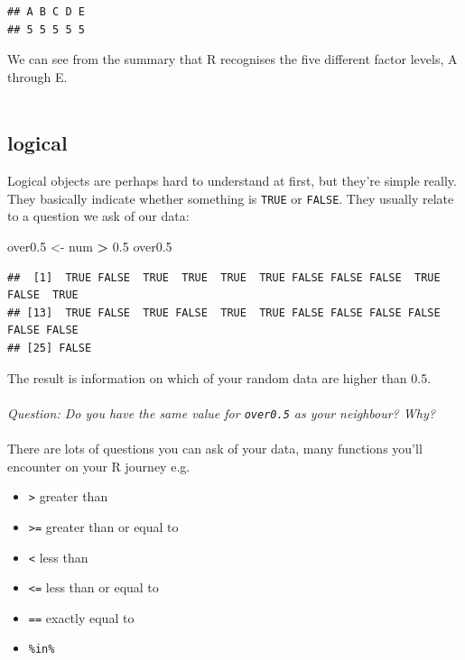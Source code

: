 \documentclass[
]{book}
\newenvironment{Shaded}{\begin{snugshade}}{\end{snugshade}}
\newcommand{\FloatTok}[1]{\textcolor[rgb]{0.00,0.00,0.81}{#1}}
\newcommand{\NormalTok}[1]{#1}
\newcommand{\OperatorTok}[1]{\textcolor[rgb]{0.81,0.36,0.00}{\textbf{#1}}}
\newcommand{\StringTok}[1]{\textcolor[rgb]{0.31,0.60,0.02}{#1}}
\providecommand{\tightlist}{%
  \setlength{\itemsep}{0pt}\setlength{\parskip}{0pt}}
\begin{document}
\begin{verbatim}
## A B C D E 
## 5 5 5 5 5
\end{verbatim}

We can see from the summary that R recognises the five different factor levels,
A through E.\\
~\\

\hypertarget{logical}{%
\subsection{logical}\label{logical}}

Logical objects are perhaps hard to understand at first, but they're simple
really. They basically indicate whether something is \texttt{TRUE} or \texttt{FALSE}. They
usually relate to a question we ask of our data:

\begin{Shaded}
\begin{Highlighting}[]
\NormalTok{over0}\FloatTok{.5}\NormalTok{ <-}\StringTok{ }\NormalTok{num }\OperatorTok{>}\StringTok{ }\FloatTok{0.5}
\NormalTok{over0}\FloatTok{.5}
\end{Highlighting}
\end{Shaded}

\begin{verbatim}
##  [1]  TRUE FALSE  TRUE  TRUE  TRUE  TRUE FALSE FALSE FALSE  TRUE FALSE  TRUE
## [13]  TRUE FALSE  TRUE FALSE  TRUE  TRUE FALSE FALSE FALSE FALSE FALSE FALSE
## [25] FALSE
\end{verbatim}

The result is information on which of your random data are higher than 0.5.\\
~\\

\emph{Question: Do you have the same value for \texttt{over0.5} as your neighbour? Why?}\\
~\\

There are lots of questions you can ask of your data, many functions you'll
encounter on your R journey e.g.~

\begin{itemize}
\tightlist
\item
  \texttt{\textgreater{}} greater than
\item
  \texttt{\textgreater{}=} greater than or equal to
\item
  \texttt{\textless{}} less than
\item
  \texttt{\textless{}=} less than or equal to
\item
  \texttt{==} exactly equal to
\item
  \texttt{\%in\%}~\\
\end{itemize}
\end{document}
